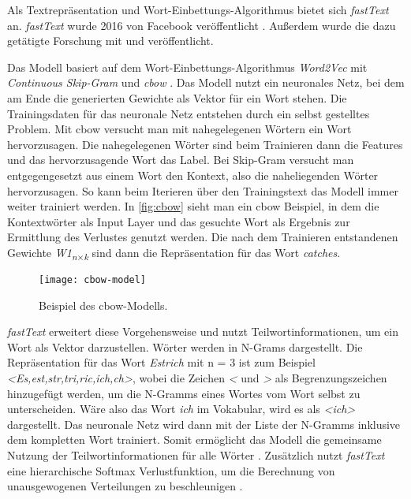 Als Textrepräsentation und Wort-Einbettungs-Algorithmus bietet sich \textit{fastText} an. \textit{fastText} wurde 2016 von Facebook veröffentlicht \citep[vgl.][]{fastText_release2016}. Außerdem wurde die dazu getätigte Forschung mit \cite{bojanowski2017enriching} und \cite{joulin2016bag} veröffentlicht.

Das Modell basiert auf dem Wort-Einbettungs-Algorithmus \textit{Word2Vec} mit \textit{Continuous Skip-Gram} und \textit{\ac{cbow}} \citep[vgl.][]{bojanowski2017enriching}. Das Modell nutzt ein neuronales Netz, bei dem am Ende die generierten Gewichte als Vektor für ein Wort stehen. Die Trainingsdaten für das neuronale Netz entstehen durch ein selbst gestelltes Problem. Mit \ac{cbow} versucht man mit nahegelegenen Wörtern ein Wort hervorzusagen. Die nahegelegenen Wörter sind beim Trainieren dann die Features und das hervorzusagende Wort das Label. Bei Skip-Gram versucht man entgegengesetzt aus einem Wort den Kontext, also die naheliegenden Wörter hervorzusagen. So kann beim Iterieren über den Trainingstext das Modell immer weiter trainiert werden. In \autoref{fig:cbow} sieht man ein \ac{cbow} Beispiel, in dem die Kontextwörter als Input Layer und das gesuchte Wort als Ergebnis zur Ermittlung des Verlustes genutzt werden. Die nach dem Trainieren entstandenen Gewichte \textit{W1\textsubscript{n$\times $k}}\: sind dann die Repräsentation für das Wort \textit{catches}.
\begin{figure}[h]
	\centering
	\texttt{[image: cbow-model]}
	\caption{Beispiel des \ac{cbow}-Modells.}
	\label{fig:cbow}
\end{figure}
\textit{fastText} erweitert diese Vorgehensweise und nutzt Teilwortinformationen, um ein Wort als Vektor darzustellen. Wörter werden in N-Grams dargestellt. \citep[vgl.][]{bojanowski2017enriching} Die Repräsentation für das Wort \textit{Estrich} mit n = 3 ist zum Beispiel \textit{<Es,est,str,tri,ric,ich,ch>}, wobei die Zeichen \textit{<} und \textit{>} als Begrenzungszeichen hinzugefügt werden, um die N-Gramms eines Wortes vom Wort selbst zu unterscheiden. Wäre also das Wort \textit{ich} im Vokabular, wird es als \textit{<ich>} dargestellt. Das neuronale Netz wird dann mit der Liste der N-Gramms inklusive dem kompletten Wort trainiert. Somit ermöglicht das Modell die gemeinsame Nutzung der Teilwortinformationen für alle Wörter \citep[vgl.][]{bojanowski2017enriching}. Zusätzlich nutzt \textit{fastText} eine hierarchische Softmax Verlustfunktion, um die Berechnung von unausgewogenen Verteilungen zu beschleunigen \citep[vgl.][]{fastText_release2016}.

